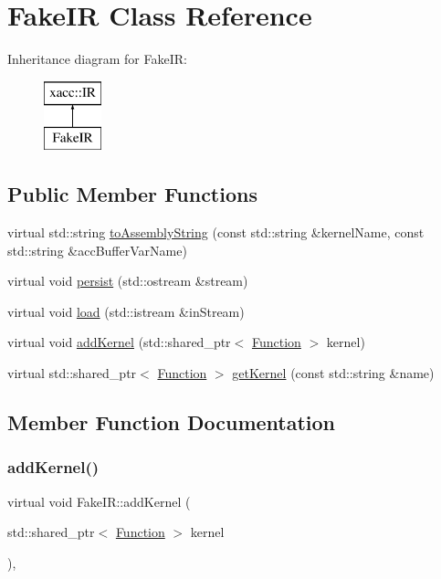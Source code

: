 \hypertarget{a02492}{}\section{Fake\+IR Class Reference}
\label{a02492}
Inheritance diagram for Fake\+IR\+:\begin{figure}[H]
\begin{center}
\leavevmode
\includegraphics[height=2.000000cm]{a02492}
\end{center}
\end{figure}
\subsection*{Public Member Functions}
\begin{DoxyCompactItemize}
\item 
virtual std\+::string \hyperlink{a02492_ac8b4fa63654de7830e2a6110559ffd87}{to\+Assembly\+String} (const std\+::string \&kernel\+Name, const std\+::string \&acc\+Buffer\+Var\+Name)
\item 
virtual void \hyperlink{a02492_a459bd7e4a007ab80678df279eb038b51}{persist} (std\+::ostream \&stream)
\item 
virtual void \hyperlink{a02492_ad079b5e83c97bc7fae776679e0f93a1e}{load} (std\+::istream \&in\+Stream)
\item 
virtual void \hyperlink{a02492_a526ef10e1ee21f5552b1ca61872f541a}{add\+Kernel} (std\+::shared\+\_\+ptr$<$ \hyperlink{a02456}{Function} $>$ kernel)
\item 
virtual std\+::shared\+\_\+ptr$<$ \hyperlink{a02456}{Function} $>$ \hyperlink{a02492_a351b9a1f9fb748612f5a39007c421efc}{get\+Kernel} (const std\+::string \&name)
\end{DoxyCompactItemize}


\subsection{Member Function Documentation}
\mbox{\label{a02492_a526ef10e1ee21f5552b1ca61872f541a}} 
\subsubsection{\texorpdfstring{add\+Kernel()}{addKernel()}}
{\footnotesize\ttfamily virtual void Fake\+I\+R\+::add\+Kernel (\begin{DoxyParamCaption}\item[{std\+::shared\+\_\+ptr$<$ \hyperlink{a02456}{Function} $>$}]{kernel }\end{DoxyParamCaption})\hspace{0.3cm}{\ttfamily [inline]}, {\ttfamily [virtual]}}

